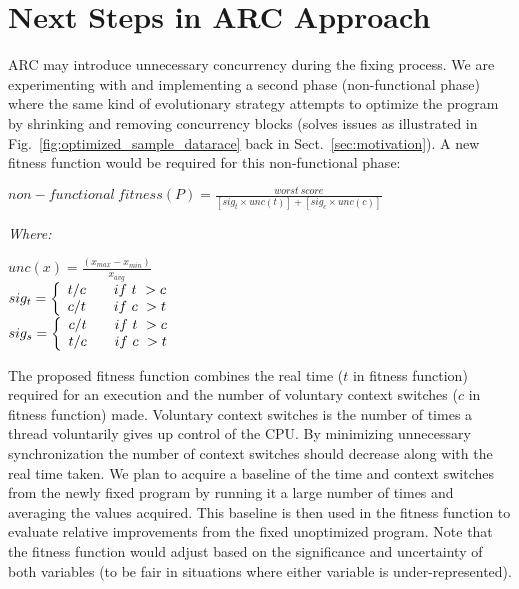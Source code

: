 \section{Next Steps in ARC Approach}
\label{sec:ongoing}

ARC may introduce unnecessary concurrency during the fixing process. We are
experimenting with and implementing a second phase (non-functional phase) where
the same kind of evolutionary strategy attempts to optimize the program by
shrinking and removing concurrency blocks (solves issues as illustrated in
Fig.~\ref{fig:optimized_sample_datarace} back in Sect.~\ref{sec:motivation}). A
new fitness function would be required for this non-functional phase:

\begin{footnotesize}
\begin{center}
$non-functional\ fitness(P) = \frac{worst\ score}{[sig_t \times unc(t)] + [sig_c \times unc(c)]}$
\end{center}
\vspace{0.1cm} \textit{Where:} \vspace{0.1cm}
\end{footnotesize}
\begin{scriptsize}
\begin{center}
$unc(x) = \frac{(x_{max} - x_{min})}{x_{avg}}$ \\ \vspace{0.2cm}
$
 sig_t = \left\{
 \begin{array}{l l}
   t/c & \quad if\ t\ > c \\
   c/t & \quad if\ c\ > t \\
 \end{array} \right.
$ \\ \vspace{0.2cm}
$
 sig_s = \left\{
 \begin{array}{l l}
   c/t & \quad if\ t\ > c \\
   t/c & \quad if\ c\ > t \\
 \end{array} \right.
$ \\
\end{center}
\end{scriptsize}


\noindent The proposed fitness function combines the real time ($t$ in fitness function) required for an execution and the number of
voluntary context switches ($c$ in fitness function) made.  Voluntary context switches is the number of times a thread voluntarily gives up control of the CPU. By minimizing unnecessary synchronization the number of context switches should
decrease along with the real time taken. We plan to acquire a baseline of the
time and context switches from the newly fixed program by running it a large
number of times and averaging the values acquired. This baseline is then used in
the fitness function to evaluate relative improvements from the fixed
unoptimized program. Note that the fitness function would adjust based on the
significance and uncertainty of both variables (to be fair in situations where
either variable is under-represented).

